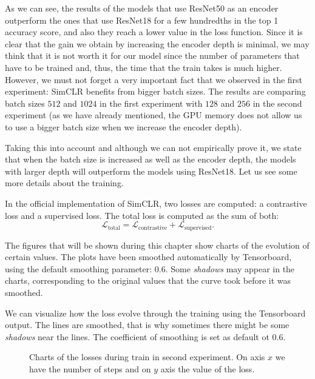     As we can see, the results of the models that use ResNet50  as an encoder outperform the ones that use ResNet18 for a few hundredths in the top 1 accuracy score, and also they reach a lower value in the loss function. Since it is clear that the gain we obtain by increasing the encoder depth is minimal, we may think that it is not worth it for our model since the number of parameters that have to be trained and, thus, the time that the train takes is much higher. However, we must not forget a very important fact that we observed in the first experiment: SimCLR benefits from bigger batch sizes. The results are comparing batch sizes $512$ and $1024$ in the first experiment with $128$ and $256$ in the second experiment (as we have already mentioned, the GPU memory does not allow us to use a bigger batch size when we increase the encoder depth).

    Taking this into account and although we can not empirically prove it, we state that when the batch size is increased as well as the encoder depth, the models with larger depth will outperform the models using ResNet18. Let us see some more details about the training.

    In the official implementation of SimCLR, two losses are computed: a contrastive loss and a supervised loss. The total loss is computed as the sum of both:
    \[
    \mathcal L_{\operatorname{total}} = \mathcal L_{\operatorname{contrastive} }+ \mathcal L_{\operatorname{supervised}}.    
    \]

\begin{remark}
The figures that will be shown during this chapter show charts of the evolution of certain values. The plots have been smoothed automatically by Tensorboard, using the default smoothing parameter: $0.6$. Some \emph{shadows} may appear in the charts, corresponding to the original values that the curve took before it was smoothed.
\end{remark}

    We can visualize how the loss evolve through the training using the Tensorboard output. The lines are smoothed, that is why sometimes there might be some \emph{shadows} near the lines. The coefficient of smoothing is set as default ot $0.6$. 
    \begin{figure}[htp] 
        \centering
        \hfill%
            \caption{Charts of the losses during train in second experiment. On axis $x$ we have the number of steps and on $y$ axis the value of the loss.}
            \label{fig:exp2:both:losses}
    \end{figure}


